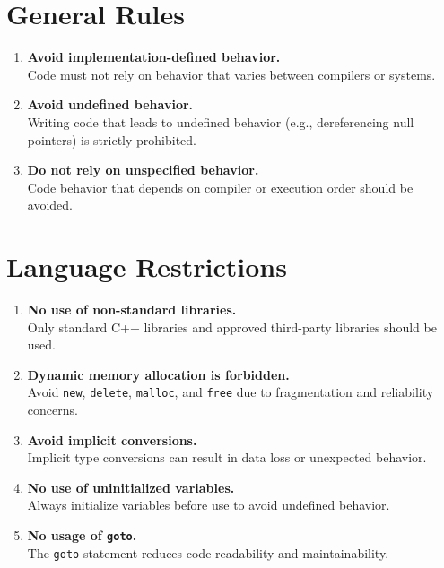 \section{General Rules}
\begin{enumerate}
    \item \textbf{Avoid implementation-defined behavior.} \\
    Code must not rely on behavior that varies between compilers or systems.
    
    \item \textbf{Avoid undefined behavior.} \\
    Writing code that leads to undefined behavior (e.g., dereferencing null pointers) is strictly prohibited.
    
    \item \textbf{Do not rely on unspecified behavior.} \\
    Code behavior that depends on compiler or execution order should be avoided.
\end{enumerate}

\section{Language Restrictions}
\begin{enumerate}
    \item \textbf{No use of non-standard libraries.} \\
    Only standard C++ libraries and approved third-party libraries should be used.

    \item \textbf{Dynamic memory allocation is forbidden.} \\
    Avoid \texttt{new}, \texttt{delete}, \texttt{malloc}, and \texttt{free} due to fragmentation and reliability concerns.

    \item \textbf{Avoid implicit conversions.} \\
    Implicit type conversions can result in data loss or unexpected behavior.

    \item \textbf{No use of uninitialized variables.} \\
    Always initialize variables before use to avoid undefined behavior.

    \item \textbf{No usage of \texttt{goto}.} \\
    The \texttt{goto} statement reduces code readability and maintainability.
\end{enumerate}

